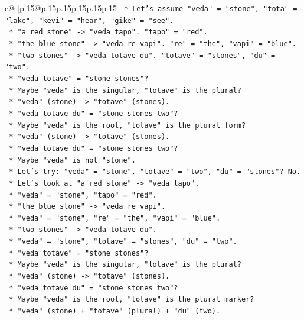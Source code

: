 \documentclass{article}
\begin{document}
{\begin{supertabular}{c@{$\;$}|p{.15\linewidth}@{}p{.15\linewidth}p{.15\linewidth}p{.15\linewidth}p{.15\linewidth}p{.15\linewidth}}
{{{\texttt{    *   Let's assume "veda" = "stone", "tota" = "lake", "kevi" = "hear", "gike" = "see".} \\
\texttt{    *   "a red stone" {-}> "veda tapo". "tapo" = "red".} \\
\texttt{    *   "the blue stone" {-}> "veda re vapi". "re" = "the", "vapi" = "blue".} \\
\texttt{    *   "two stones" {-}> "veda totave du". "totave" = "stones", "du" = "two".} \\
\texttt{    *   "veda totave" = "stone stones"?} \\
\texttt{    *   Maybe "veda" is the singular, "totave" is the plural?} \\
\texttt{    *   "veda" (stone) {-}> "totave" (stones).} \\
\texttt{    *   "veda totave du" = "stone stones two"?} \\
\texttt{    *   Maybe "veda" is the root, "totave" is the plural form?} \\
\texttt{    *   "veda" (stone) {-}> "totave" (stones).} \\
\texttt{    *   "veda totave du" = "stone stones two"?} \\
\texttt{    *   Maybe "veda" is not "stone".} \\
\texttt{    *   Let's try: "veda" = "stone", "totave" = "two", "du" = "stones"? No.} \\
\texttt{    *   Let's look at "a red stone" {-}> "veda tapo".} \\
\texttt{    *   "veda" = "stone", "tapo" = "red".} \\
\texttt{    *   "the blue stone" {-}> "veda re vapi".} \\
\texttt{    *   "veda" = "stone", "re" = "the", "vapi" = "blue".} \\
\texttt{    *   "two stones" {-}> "veda totave du".} \\
\texttt{    *   "veda" = "stone", "totave" = "stones", "du" = "two".} \\
\texttt{    *   "veda totave" = "stone stones"?} \\
\texttt{    *   Maybe "veda" is the singular, "totave" is the plural?} \\
\texttt{    *   "veda" (stone) {-}> "totave" (stones).} \\
\texttt{    *   "veda totave du" = "stone stones two"?} \\
\texttt{    *   Maybe "veda" is the root, "totave" is the plural marker?} \\
\texttt{    *   "veda" (stone) + "totave" (plural) + "du" (two).} \\
}}}
\end{supertabular}}
\end{document}

